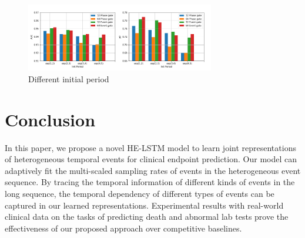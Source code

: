 \documentclass[letterpaper]{article} %
\begin{document}
\begin{figure}[!t]
\centering
\includegraphics[width=0.9810000000000001\linewidth,height=1.17in ]{init_period.png}

\caption{Different initial period}

\label{fig:period}
\end{figure}







\section{Conclusion}
In this paper, we propose a novel HE-LSTM model
to learn joint representations of heterogeneous temporal events for clinical endpoint prediction.
Our model can adaptively fit the multi-scaled sampling rates of events in the heterogeneous event sequence. By tracing the temporal information of different kinds of events in the long sequence, the temporal dependency of different types of events can be captured in our learned representations.
Experimental results with real-world clinical data on the tasks of predicting death and abnormal lab tests prove the effectiveness of our proposed approach over competitive baselines.

\vspace{-0.91mm}
\vspace{-1.58mm}
\end{document}
